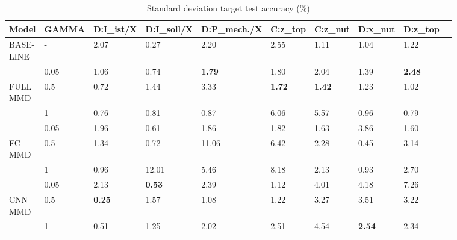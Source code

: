 \begin{sidewaystable}
\begin {table}[H]
\centering
\begin{tabular}{llllllllll}
  \toprule
  Model          & GAMMA    & D:I\_ist/X & D:I\_soll/X & D:P\_mech./X & C:z\_top & C:z\_nut & D:x\_nut & D:z\_top  \\
  \midrule

    \vspace{1cm}

    \thead{BASE- \\ LINE}   & -      & 2.07 & 0.27 & 2.20 & 2.55 & 1.11 & 1.04 & 1.22\\
 
                            & 0.05   & 1.06 & 0.74 & \textbf{1.79} & 1.80 & 2.04 & 1.39 & \textbf{2.48}\\
    \thead{FULL \\ MMD}     & 0.5    & 0.72 & 1.44 & 3.33 & \textbf{1.72} & \textbf{1.42} & 1.23 & 1.02\\
    
    \vspace{1cm}  
    
                            & 1      & 0.76 & 0.81 & 0.87 & 6.06 & 5.57 & 0.96 & 0.79\\



                            & 0.05   & 1.96 & 0.61 & 1.86 & 1.82 & 1.63 & 3.86 & 1.60\\
    \thead{FC \\ MMD}       & 0.5    & 1.34 & 0.72 & 11.06 & 6.42 & 2.28 & 0.45 & 3.14\\
    
    \vspace{1cm}
    
                            & 1      & 0.96 & 12.01 & 5.46 & 8.18 & 2.13 & 0.93 & 2.70\\
                            & 0.05   & 2.13 & \textbf{0.53} & 2.39 & 1.12 & 4.01 & 4.18 & 7.26\\
    \thead{CNN \\ MMD}      & 0.5    & \textbf{0.25} & 1.57 & 1.08 & 1.22 & 3.27 & 3.51 & 3.22\\
                            & 1      & 0.51 & 1.25 & 2.02 & 2.51 & 4.54 & \textbf{2.54} & 2.34\\
  \bottomrule
\end{tabular}
\caption {Standard deviation target test accuracy (\%)} \label{tab:Variance_Accuracy} 
\end {table}
\end{sidewaystable}



